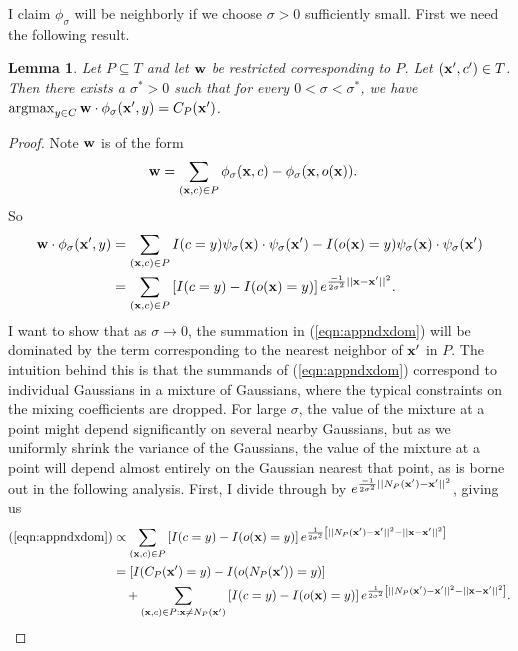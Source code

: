 \documentclass[preprint]{elsarticle}
\newcommand{\argmax}{\operatornamewithlimits{argmax}}
\newcommand{\ls}{ \left[}
\newcommand{\rs}{ \right]}
\newtheorem{lemma}{Lemma}
\begin{document}
I claim $\phi_\sigma$ will be neighborly if we choose $\sigma > 0$ sufficiently small. First we need the following result.

\begin{lemma}
\label{thm:appdxlemma}
Let $P \subseteq T$ and let ${\bf w}$ be restricted corresponding to $P$. Let $({\bf x}',c') \in T$. Then there exists a $\sigma^*>0$ such that for every $0 < \sigma < \sigma^*$, we have $\argmax_{y \in C} {\bf w} \cdot \phi_\sigma({\bf x}',y) = C_P({\bf x}')$.
\end{lemma}
\begin{proof}
Note ${\bf w}$ is of the form
\begin{align*}
{\bf w} 
&= \sum_{({\bf x},c) \in P} \phi_\sigma({\bf x},c) - \phi_\sigma({\bf x},o({\bf x})).
\end{align*}
So 
\begin{align}
{\bf w} \cdot \phi_\sigma({\bf x}',y)
&= \sum_{({\bf x},c) \in P} I(c=y) \psi_\sigma({\bf x}) \cdot \psi_\sigma({\bf x}') - I(o({\bf x})=y) \psi_\sigma({\bf x}) \cdot \psi_\sigma({\bf x}') \\
&= \sum_{({\bf x},c) \in P} \ls I(c=y) - I(o({\bf x})=y) \rs e^{\frac{-1}{2 \sigma^2} ||{\bf x} - {\bf x'} ||^2}. \label{eqn:appndxdom}
\end{align}
I want to show that as $\sigma \rightarrow 0$, the summation in (\ref{eqn:appndxdom}) will be dominated by the term corresponding to the nearest neighbor of ${\bf x}'$ in $P$. The intuition behind this is that the summands of (\ref{eqn:appndxdom}) correspond to individual Gaussians in a mixture of Gaussians, where the typical constraints on the mixing coefficients are dropped. For large $\sigma$, the value of the mixture at a point might depend significantly on several nearby Gaussians, but as we uniformly shrink the variance of the Gaussians, the value of the mixture at a point will depend almost entirely on the Gaussian nearest that point, as is borne out in the following analysis. First, I divide through by $e^{\frac{-1}{2 \sigma^2} ||N_P({\bf x}') - {\bf x'} ||^2}$, giving us
\begin{align}
(\ref{eqn:appndxdom})
&\propto \sum_{({\bf x},c) \in P} \ls I(c=y) - I(o({\bf x})=y) \rs e^{\frac{1}{2 \sigma^2} \ls ||N_P({\bf x}') - {\bf x'} ||^2 - ||{\bf x} - {\bf x'} ||^2 \rs} \\
&= \ls I(C_P({\bf x}')=y) - I(o(N_P({\bf x}'))=y) \rs \nonumber \\
&\quad + \sum_{({\bf x},c) \in P:{\bf x} \neq N_P({\bf x}')} \ls I(c=y) - I(o({\bf x})=y) \rs e^{\frac{1}{2 \sigma^2} \ls ||N_P({\bf x}') - {\bf x'} ||^2 - ||{\bf x} - {\bf x'} ||^2 \rs}. \label{eqn:appndxsep}

\end{align}
\end{proof}
\end{document}
